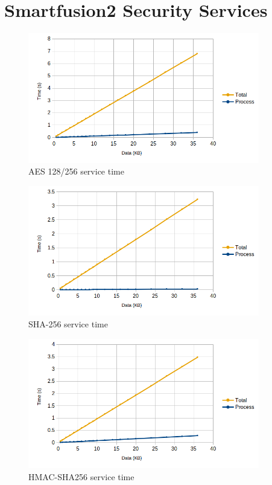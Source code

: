 \section{Smartfusion2 Security Services}\label{chap:evaluation:board}

\begin{figure}[h!]
	\centering
	\includegraphics[width=0.9\textwidth]{./Images/aes-time.png}
	\caption{AES 128/256 service time}
	\label{fig:performance:aes:time}
\end{figure}

\begin{figure}[h!]
	\centering
	\includegraphics[width=0.9\textwidth]{./Images/sha-time.png}
	\caption{SHA-256 service time}
	\label{fig:performance:sha:time}
\end{figure}

\begin{figure}[h!]
	\centering
	\includegraphics[width=0.9\textwidth]{./Images/hmac-time.png}
	\caption{HMAC-SHA256 service time}
	\label{fig:performance:hmac:time}
\end{figure}

